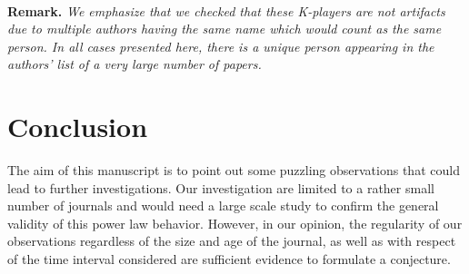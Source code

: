 \documentclass[aps,prl,floatfix,twocolumn]{revtex4-1}
\begin{document}
\paragraph{}
{\bf Remark.}\textit{
We emphasize that we checked that these K-players are not artifacts due to multiple authors having the same name which would count as the same person. 
In all cases presented here, there is a unique person appearing in the authors' list of a very large number of papers. 
}

\section{Conclusion}
The aim of this manuscript is to point out some puzzling observations that could lead to further investigations. 
Our investigation are limited to a rather small number of journals and would need a large scale study to confirm the general validity of this power law behavior. 
However, in our opinion, the regularity of our observations regardless of the size and age of the journal, 
as well as with respect of the time interval considered are sufficient evidence to formulate a conjecture. 




\end{document}
